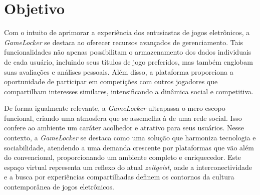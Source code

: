 \section{Objetivo}
\label{sec:objetivo}

Com o intuito de aprimorar a experiência dos entusiastas de jogos eletrônicos, a \textit{GameLocker} se destaca ao oferecer recursos avançados de gerenciamento. Tais funcionalidades não apenas possibilitam o armazenamento dos dados individuais de cada usuário, incluindo seus títulos de jogo preferidos, mas também englobam suas avaliações e análises pessoais. Além disso, a plataforma proporciona a oportunidade de participar em competições com outros jogadores que compartilham interesses similares, intensificando a dinâmica social e competitiva.

De forma igualmente relevante, a \textit{GameLocker} ultrapassa o mero escopo funcional, criando uma atmosfera que se assemelha à de uma rede social. Isso confere ao ambiente um caráter acolhedor e atrativo para seus usuários. Nesse contexto, a \textit{GameLocker} se destaca como uma solução que harmoniza tecnologia e sociabilidade, atendendo a uma demanda crescente por plataformas que vão além do convencional, proporcionando um ambiente completo e enriquecedor. Este espaço virtual representa um reflexo do atual \textit{zeitgeist}, onde a interconectividade e a busca por experiências compartilhadas definem os contornos da cultura contemporânea de jogos eletrônicos.